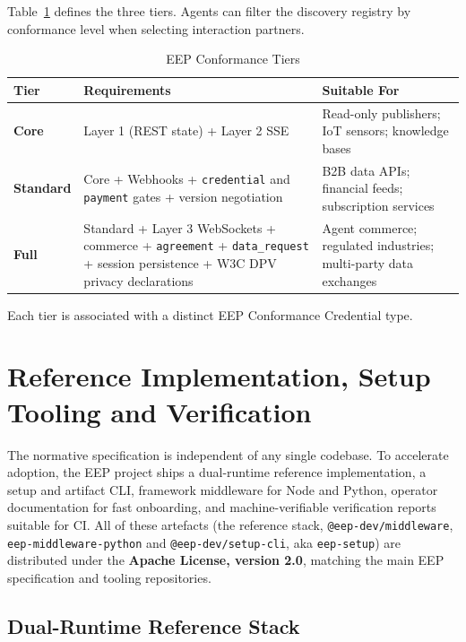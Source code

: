 \documentclass[12pt,a4paper]{article}
\begin{document}
Table~\ref{tab:conformance} defines the three tiers. Agents can filter the discovery registry by conformance level when selecting interaction partners.

\begin{table}[h!]
\centering
\caption{EEP Conformance Tiers}
\label{tab:conformance}
\renewcommand{\arraystretch}{1.3}
\begin{tabular}{|p{2.2cm}|p{5.8cm}|p{6.5cm}|}
\hline
\textbf{Tier} & \textbf{Requirements} & \textbf{Suitable For} \\
\hline
\textbf{Core} & Layer 1 (REST state) + Layer 2 SSE \cite{ref21} & Read-only publishers; IoT sensors; knowledge bases \\
\hline
\textbf{Standard} & Core + Webhooks + \texttt{credential} and \texttt{payment} gates + version negotiation & B2B data APIs; financial feeds; subscription services \\
\hline
\textbf{Full} & Standard + Layer 3 WebSockets + commerce + \texttt{agreement} + \texttt{data\_request} + session persistence + W3C DPV \cite{ref14} privacy declarations & Agent commerce; regulated industries; multi-party data exchanges \\
\hline
\end{tabular}
\end{table}

Each tier is associated with a distinct EEP Conformance Credential type.

\section{Reference Implementation, Setup Tooling and Verification}

The normative specification is independent of any single codebase. To accelerate adoption, the EEP project ships a dual-runtime reference implementation, a setup and artifact CLI, framework middleware for Node and Python, operator documentation for fast onboarding, and machine-verifiable verification reports suitable for CI. All of these artefacts (the reference stack, \texttt{@eep-dev/middleware}, \texttt{eep-middleware-python} and \texttt{@eep-dev/setup-cli}, aka \texttt{eep-setup}) are distributed under the \textbf{Apache License, version 2.0}, matching the main EEP specification and tooling repositories.

\subsection{Dual-Runtime Reference Stack}
\end{document}
